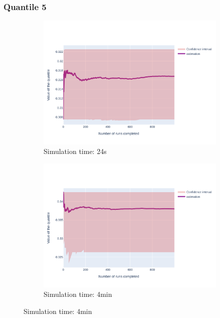 \documentclass{article}
\begin{document}
\subsubsection{Quantile 5}
\begin{figure}[H]
    \centering
    \begin{subfigure}{.495\textwidth}
        \centering
        \includegraphics[width=\textwidth]{../fig/quantile5/CC1: CAM2 --> ECU2_24s.png}
        \caption{Simulation time: 24s}
        \vspace{.5cm}
    \end{subfigure}
    \begin{subfigure}{.495\textwidth}
        \centering
        \includegraphics[width=\textwidth]{../fig/quantile5/CC1: CAM2 --> ECU2_4mn.png}
        \caption{Simulation time: 4min}

\end{subfigure}
\end{figure}
\end{document}
